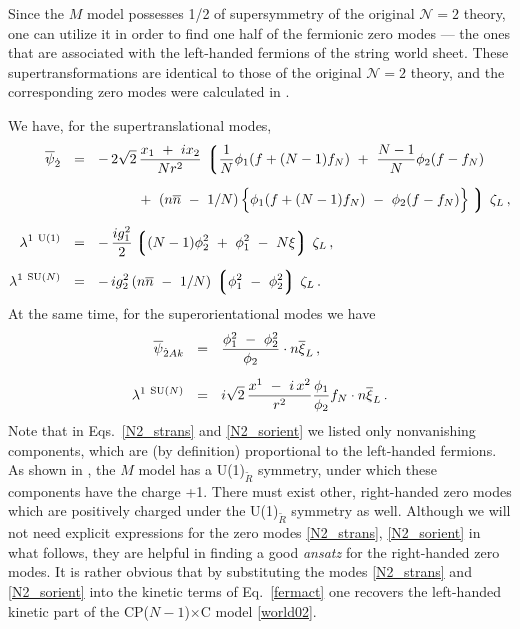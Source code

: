 \documentclass[12pt]{article}
\newcommand{\ntwo}{${\mathcal N}=2$ }
\newcommand{\wt}{\widetilde}
\newcommand{\ov}{\overline}
\newcommand{\lgr}{\left\lgroup}
\newcommand{\rgr}{\right\rgroup}
\newcommand{\nbar}{\ov{n}}
\newcommand{\CPC}{CP($N-1$)$\times$C }
\begin{document}
	Since the $M$ model possesses 1/2 of  supersymmetry of the original \ntwo theory, one can utilize
	it in order to find one half of the fermionic zero modes --- the ones that are associated 
	with the left-handed fermions of the string world sheet.
	These supertransformations are identical to those of the original \ntwo theory, and the corresponding
	zero modes were calculated in \cite{BSYhet}.

	We have, for the supertranslational modes,
\begin{align}
\label{N2_strans}
%
\notag
\ov{\psi}_{\dot{2}}	& ~~=~~  -\,  2\sqrt{2}\, \frac{x_1 ~+~ i x_2}{N r^2} \,
		\lgr \frac{1}{N} \phi_1 ( f + (N-1) f_N ) ~+~ \frac{N-1}{N} \phi_2 ( f - f_N )  \right.
		\\[2mm]
%
\notag
%
			& \phantom{~~=~~  -\,  2\sqrt{2}}
			~+~ \left( n\nbar ~-~ 1/N \right )
			\Bigl\{ \phi_1 ( f + ( N-1 ) f_N ) ~-~ \phi_2 ( f - f_N) \Bigr\}
		\left. \rgr\, \zeta_L \,,
		\\[2mm]
%
\lambda^{1\ \rm U(1)} 	& ~~=~~ -\, \frac{i g_1^2}{2} \lgr (N-1)\phi_2^2  ~+~ \phi_1^2 ~-~ N\xi \rgr \, \zeta_L \,,
		\\[2mm]
%
\notag
\lambda^{1\ \text{SU($N$)}}	& ~~=~~ -\, {i g_2^2}\, ( n\nbar ~-~ 1/N )\, \lgr \phi_1^2 ~-~ \phi_2^2 \rgr\, \zeta_L\,.
\end{align}
At the same time, for the superorientational modes we have
\begin{align}
\label{N2_sorient}
%
\notag
\overline{\psi}_{\dot{2}Ak} & ~~=~~ \frac{\phi_1^2 ~-~ \phi_2^2}{\phi_2} \cdot n \overline{\xi}_L  \,,
 \\[2mm]
%
\lambda^{1\ \text{SU($N$)}} & ~~=~~ i \sqrt{2}\, \frac{ x^1 ~-~ i\, x^2 }{r^2} 
						  \frac{\phi_1}{\phi_2} f_N \cdot n \overline{\xi}_L \,.
\end{align}
	Note that in Eqs.~\eqref{N2_strans} and \eqref{N2_sorient} we listed only  nonvanishing 
	components, which are (by definition) proportional to the left-handed fermions. 
	As shown in \cite{GSYmmodel}, the $M$ model has a U(1)$_{\wt R}$ symmetry, under which these components
	have the charge +1. 
	There must exist other, right-handed zero modes which are positively charged 
	under the U(1)$_{\wt R}$ symmetry  as well.
	Although we will not need explicit expressions for the 
	zero modes \eqref{N2_strans}, \eqref{N2_sorient} in what follows,
	they are helpful in finding a good {\it ansatz} for the right-handed zero modes.
	It is rather obvious that by substituting the modes \eqref{N2_strans} and \eqref{N2_sorient}
	into the kinetic terms of Eq.~\eqref{fermact} one recovers the left-handed kinetic part of the 
	\CPC model \eqref{world02}.
\end{document}

